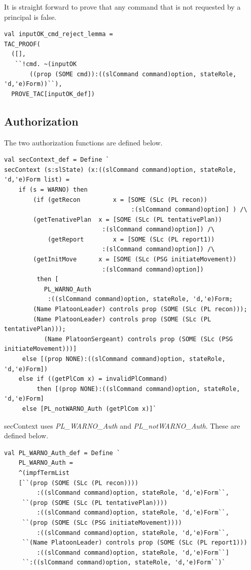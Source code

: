 \documentclass[../../main/main.tex]{subfiles}
\begin{document}
It is straight forward to prove that any command that is not requested by a principal is false.

\begin{lstlisting}
val inputOK_cmd_reject_lemma =
TAC_PROOF(
  ([],
   ``!cmd. ~(inputOK
   	   ((prop (SOME cmd)):((slCommand command)option, stateRole, 'd,'e)Form))``),
  PROVE_TAC[inputOK_def])
\end{lstlisting}

\subsection{Authorization}
The two authorization functions are defined below.

\begin{lstlisting}
val secContext_def = Define `
secContext (s:slState) (x:((slCommand command)option, stateRole, 'd,'e)Form list) =
    if (s = WARNO) then
        (if (getRecon         x = [SOME (SLc (PL recon))
                                   :(slCommand command)option] ) /\
	    (getTenativePlan  x = [SOME (SLc (PL tentativePlan))
	    		      	   :(slCommand command)option]) /\
            (getReport        x = [SOME (SLc (PL report1))
	    		      	   :(slCommand command)option]) /\
	    (getInitMove      x = [SOME (SLc (PSG initiateMovement))
	    		      	   :(slCommand command)option])
         then [
	       PL_WARNO_Auth
	        :((slCommand command)option, stateRole, 'd,'e)Form;
		(Name PlatoonLeader) controls prop (SOME (SLc (PL recon)));
		(Name PlatoonLeader) controls prop (SOME (SLc (PL tentativePlan)));
	       (Name PlatoonSergeant) controls prop (SOME (SLc (PSG initiateMovement)))]
	 else [(prop NONE):((slCommand command)option, stateRole, 'd,'e)Form])
    else if ((getPlCom x) = invalidPlCommand)
    	 then [(prop NONE):((slCommand command)option, stateRole, 'd,'e)Form]
	 else [PL_notWARNO_Auth (getPlCom x)]`
\end{lstlisting}

secContext uses \textit{PL_WARNO_Auth} and \textit{PL_notWARNO_Auth}. These are defined below.


\begin{lstlisting}
val PL_WARNO_Auth_def = Define `
    PL_WARNO_Auth =
    ^(impfTermList
    [``(prop (SOME (SLc (PL recon))))
         :((slCommand command)option, stateRole, 'd,'e)Form``,
     ``(prop (SOME (SLc (PL tentativePlan))))
         :((slCommand command)option, stateRole, 'd,'e)Form``,
     ``(prop (SOME (SLc (PSG initiateMovement))))
         :((slCommand command)option, stateRole, 'd,'e)Form``,
     ``(Name PlatoonLeader) controls prop (SOME (SLc (PL report1)))
         :((slCommand command)option, stateRole, 'd,'e)Form``]
     ``:((slCommand command)option, stateRole, 'd,'e)Form``)`
\end{lstlisting}
\end{document}

